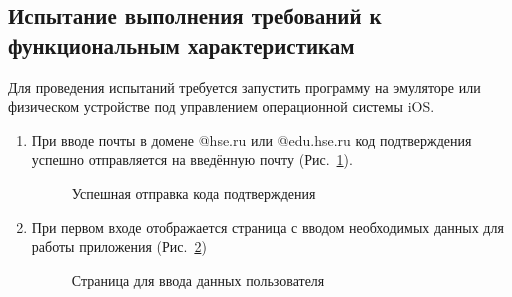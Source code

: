 \documentclass{../includes/TechDoc}
\begin{document}
    \subsection{Испытание выполнения требований к функциональным характеристикам}

    Для проведения испытаний требуется запустить программу на эмуляторе или физическом устройстве под управлением операционной системы iOS\@.

    \begin{enumerate}
        \item При вводе почты в домене @hse.ru или @edu.hse.ru код подтверждения успешно отправляется на введённую почту (Рис.~\ref{fig:login_code_success}).
        \begin{figure}[ht]
            \centering
            \caption{Успешная отправка кода подтверждения}
            \label{fig:login_code_success}
        \end{figure}

        \item При первом входе отображается страница с вводом необходимых данных для работы приложения (Рис.~\ref{fig:wait_page})
        \begin{figure}[ht]
            \centering
            \caption{Страница для ввода данных пользователя}
            \label{fig:wait_page}
        \end{figure}


\end{enumerate}
\end{document}
